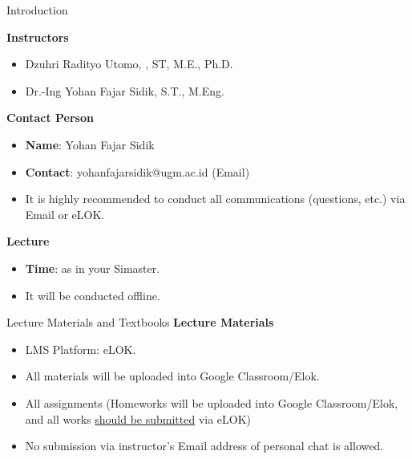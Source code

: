 \begin{frame}[t]{Introduction}

    \noindent



    \textbf{Instructors}
    \begin{itemize}
        \item Dzuhri Radityo Utomo, , ST, M.E., Ph.D.
        \item Dr.-Ing Yohan Fajar Sidik, S.T., M.Eng.
    \end{itemize}

    \textbf{Contact Person}
    \begin{itemize}
        \item \textbf{Name}: Yohan Fajar Sidik
        \item \textbf{Contact}: yohanfajarsidik@ugm.ac.id (Email)
        \item It is highly recommended to conduct all communications (questions,
            etc.) via Email or eLOK.
    \end{itemize}

    \textbf{Lecture}
    \begin{itemize}
        \item \textbf{Time}: as in your Simaster.
        \item It will be conducted offline. 
    \end{itemize}

\end{frame}

\begin{frame}[t]{Lecture Materials and Textbooks}
\textbf{Lecture Materials}
\begin{itemize}
    \item LMS Platform: eLOK.
    \item All materials will be uploaded into Google Classroom/Elok.
    \item All assignments (Homeworks will be uploaded into Google Classroom/Elok, and all works
        \underline{should be submitted} via eLOK)
    \item No submission via instructor's Email address of personal chat is allowed.
\end{itemize}
\end{frame}

